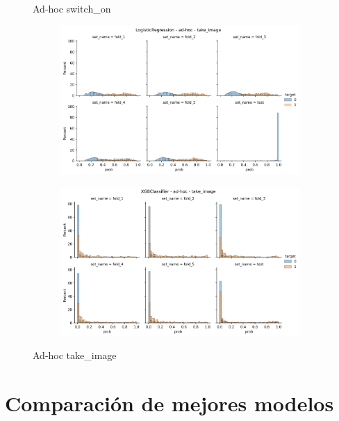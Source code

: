 \begin{figure}
\begin{subfigure}[b]{0.83\textwidth}
    \end{subfigure}
    \caption{Ad-hoc switch\_on}
\end{figure}

\begin{figure}
    \centering
    \begin{subfigure}[b]{0.83\textwidth}
    \includegraphics[width=\linewidth]{figures/results/ad-hoc/lgr/take_image/take_image__distplot.png}
    \end{subfigure}
    \hfill
    \centering
    \begin{subfigure}[b]{0.83\textwidth}
        \centering
        \includegraphics[width=\linewidth]{figures/results/ad-hoc/xgb/2021-12-07_07.38.35.967776__distplot.png}
    \end{subfigure}
    \caption{Ad-hoc take\_image}
\end{figure}

\section{Comparación de mejores modelos}
\label{results:comparison}

